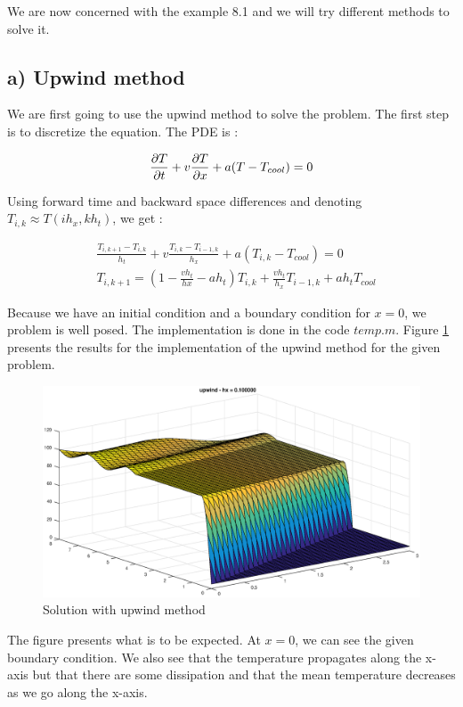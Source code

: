 We are now concerned with the example 8.1 and we will try different methods to solve it.
\subsection*{a) Upwind method} 

We are first going to use the upwind method to solve the problem. The first step is to discretize the equation. The PDE is :

$$\frac{\partial T}{\partial t}+v\frac{\partial T}{\partial x}+ a(T-T_{cool})=0$$

Using forward time and backward space differences and denoting $T_{i,k} \approx T(ih_x,kh_t)$, we get :

\begin{align*}
&\frac{T_{i,k+1}-T_{i,k}}{h_t}+v\frac{T_{i,k}-T_{i-1,k}}{h_x}+a(T_{i,k}-T_{cool})=0\\
&T_{i,k+1} = (1-\frac{vh_t}{hx}-ah_t)T_{i,k}+\frac{vh_t}{h_x}T_{i-1,k}+ah_tT_{cool}
\end{align*}

Because we have an initial condition and a boundary condition for $x=0$, we problem is well posed. The implementation is done in the code $temp.m$. Figure \ref{up} presents the results for the implementation of the upwind method for the given problem.

\begin{figure}
\begin{center}
\includegraphics[scale=0.4]{upwind.eps}
\caption{Solution with upwind method}
\label{up}
\end{center}
\end{figure}

The figure presents what is to be expected. At $x=0$, we can see the given boundary condition. We also see that the temperature propagates along the x-axis but that there are some dissipation and that the mean temperature decreases as we go along the x-axis.

